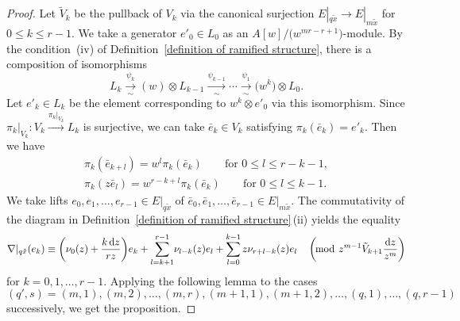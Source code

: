 \documentclass[pdftex]{sigma}
\numberwithin{equation}{section}
\begin{document}
\begin{proof}Let $\tilde{V}_k$ be the pullback of $V_k$ via the canonical surjection
$E|_{q\tilde{x}} \longrightarrow E|_{m\tilde{x}}$
for $0\leq k \leq r-1$.
We take a generator $e'_0\in L_0$ as an
$A[w]/\big(w^{mr-r+1}\big)$-module.
By the condition~(iv) of Definition~\ref{definition of ramified structure},
there is a composition of isomorphisms
\[
 L_k\xrightarrow[\sim]{\psi_k} (w)\otimes L_{k-1}\xrightarrow[\sim]{\psi_{k-1}}
 \cdots\xrightarrow[\sim]{\psi_1}\big(w^k\big)\otimes L_0.
\]
Let $e'_k\in L_k$ be the element corresponding to $w^k\otimes e'_0$
via this isomorphism.
Since
$ \pi_k|_{V_k} \colon V_k \xrightarrow {\pi_k|_{V_k}} L_k $
is surjective, we can take
$\bar{e}_k\in V_k$
satisfying
$\pi_k(\bar{e}_k)=e'_k$.
Then we have
\begin{gather*}
 \pi_k(\bar{e}_{k+l})
 =
 w^l\pi_k(\bar{e}_k)
 \qquad
 \text{for $0\leq l\leq r-k-1$},
 \\
 \pi_k(z\bar{e}_l)
 =
 w^{r-k+l}\pi_k(\bar{e}_k)
 \qquad
 \text{for $0\leq l\leq k-1$}.
\end{gather*}
We take lifts $e_0,e_1,\dots,e_{r-1}\in E|_{q\tilde{x}}$
of $\bar{e}_0,\bar{e}_1,\dots,\bar{e}_{r-1}\in E|_{m\tilde{x}}$.
The commutativity of the diagram in
Definition~\ref{definition of ramified structure}\,(ii)
yields the equality
\begin{gather*}
 \nabla|_{q\tilde{x}}(e_k)
 \equiv
 \left( \nu_0(z) + \frac {k\,{\rm d}z} {r z} \right)\! e_k
 +
 \sum_{l=k+1}^{r-1}\! \nu_{l-k}(z) e_l
 +\sum_{l=0}^{k-1} z \nu_{r+l-k}(z) e_l
 \quad
 \left(\! \bmod \ z^{m-1}\tilde{V}_{k+1}\frac{{\rm d}z}{z^m} \right)
\end{gather*}
for $k=0,1,\dots,r-1$.
Applying the following lemma to the cases
\[
 (q',s)=(m,1),(m,2),\dots,(m,r),(m+1,1),(m+1,2),\dots,(q,1),\dots,(q,r-1)
\]
successively, we get the proposition.
\end{proof}
\end{document}
